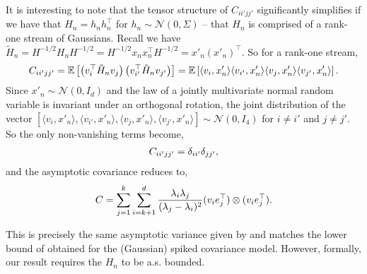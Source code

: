 It is interesting to note that the tensor structure of $C_{ii'jj'}$ significantly simplifies if we have that $H_n = h_n h_n^\top$ for $h_n \sim \mathcal{N}(0, \Sigma)$ -- that $H_n$ is comprised of a rank-one stream of Gaussians. Recall we have $\tilde{H}_n = H^{-1/2} H_n H^{-1/2} = H^{-1/2} x_n x_n^\top H^{-1/2} = x'_n (x'_n)^\top$.
So for a rank-one stream,
\begin{align}
  C_{ii'jj'} = \mathbb{E} \left[\left(v_i^\top \tilde H_n v_j\right) \left(v_{i'}^\top \tilde H_n v_{j'}\right)\right]  = \mathbb{E} \left[ \langle v_i, x'_n \rangle
  \langle v_{i'}, x'_n \rangle \langle v_j, x'_n \rangle \langle v_{j'}, x'_n \rangle \right]. \notag
\end{align}
Since $x'_n \sim \mathcal{N}(0, I_d)$ and the law of a jointly multivariate normal random variable is invariant under an orthogonal rotation, the joint distribution of the vector
$[\langle v_i, x'_n \rangle,
\langle v_{i'}, x'_n \rangle, \langle v_j, x'_n \rangle, \langle v_{j'}, x'_n \rangle] \sim \mathcal{N}(0, I_4)$ for $i \neq i'$ and $j \neq j'$. So the only non-vanishing terms become,
\begin{align}
  C_{ii'jj'} = \delta_{ii'} \delta_{jj'}, \notag
\end{align} and the asymptotic covariance reduces to,
\begin{align}
    C = \sum_{j=1}^k\sum_{i=k+1}^d\frac{{\lambda_i \lambda_j}}{(\lambda_j-\lambda_i)^2} (v_i e_j^\top) \otimes (v_{i} e_{j}^\top). \notag
\end{align}

This is precisely the same asymptotic variance given by \citet{reiss2016non} and matches the lower bound of \citet{CaiMaWu13} obtained for the (Gaussian) spiked covariance model. However, formally, our result requires the $H_n$ to be a.s. bounded.

